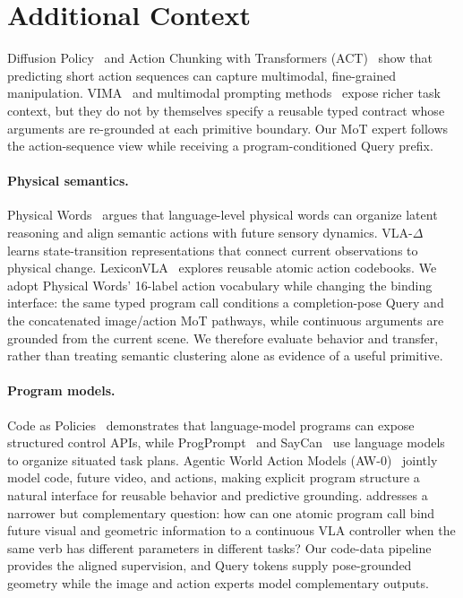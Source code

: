 \appendix
\renewcommand{\theequation}{\Alph{section}\arabic{equation}}
\section{Additional Context}
\label{app:related}

Diffusion Policy~\cite{diffpolicy} and Action Chunking with Transformers (ACT)~\cite{act} show that predicting short action sequences can capture multimodal, fine-grained manipulation. VIMA~\cite{vima} and multimodal prompting methods~\cite{saycan} expose richer task context, but they do not by themselves specify a reusable typed contract whose arguments are re-grounded at each primitive boundary. Our MoT expert follows the action-sequence view while receiving a program-conditioned Query prefix.

\paragraph{Physical semantics.}
Physical Words~\cite{physicalwords} argues that language-level physical words can organize latent reasoning and align semantic actions with future sensory dynamics. VLA-$\Delta$~\cite{vladelta} learns state-transition representations that connect current observations to physical change. LexiconVLA~\cite{lexiconvla} explores reusable atomic action codebooks. We adopt Physical Words' 16-label action vocabulary while changing the binding interface: the same typed program call conditions a completion-pose Query and the concatenated image/action MoT pathways, while continuous arguments are grounded from the current scene. We therefore evaluate behavior and transfer, rather than treating semantic clustering alone as evidence of a useful primitive.

\paragraph{Program models.}
Code as Policies~\cite{codeaspolicies} demonstrates that language-model programs can expose structured control APIs, while ProgPrompt~\cite{progprompt} and SayCan~\cite{saycan} use language models to organize situated task plans. Agentic World Action Models (AW-0)~\cite{aw0} jointly model code, future video, and actions, making explicit program structure a natural interface for reusable behavior and predictive grounding. \model{} addresses a narrower but complementary question: how can one atomic program call bind future visual and geometric information to a continuous VLA controller when the same verb has different parameters in different tasks? Our code-data pipeline provides the aligned supervision, and Query tokens supply pose-grounded geometry while the image and action experts model complementary outputs.

